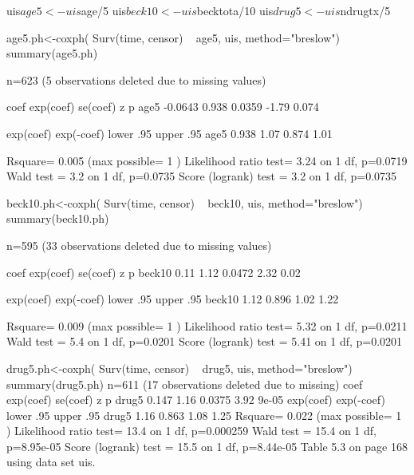 uis$age5 <- uis$age/5
uis$beck10 <- uis$becktota/10
uis$drug5 <- uis$ndrugtx/5

age5.ph<-coxph( Surv(time, censor) ~ age5, uis, method="breslow")
summary(age5.ph)

  n=623 (5 observations deleted due to missing values)

        coef exp(coef) se(coef)     z     p 
age5 -0.0643     0.938   0.0359 -1.79 0.074

     exp(coef) exp(-coef) lower .95 upper .95 
age5     0.938       1.07     0.874      1.01

Rsquare= 0.005   (max possible= 1 )
Likelihood ratio test= 3.24 on 1 df,   p=0.0719
Wald test            = 3.2  on 1 df,   p=0.0735
Score (logrank) test = 3.2  on 1 df,   p=0.0735

beck10.ph<-coxph( Surv(time, censor) ~ beck10, uis, method="breslow")
summary(beck10.ph)

  n=595 (33 observations deleted due to missing values)

       coef exp(coef) se(coef)    z    p 
beck10 0.11      1.12   0.0472 2.32 0.02

       exp(coef) exp(-coef) lower .95 upper .95 
beck10      1.12      0.896      1.02      1.22

Rsquare= 0.009   (max possible= 1 )
Likelihood ratio test= 5.32  on 1 df,   p=0.0211
Wald test            = 5.4   on 1 df,   p=0.0201
Score (logrank) test = 5.41  on 1 df,   p=0.0201

drug5.ph<-coxph( Surv(time, censor) ~ drug5, uis, method="breslow")
summary(drug5.ph)
  n=611 (17 observations deleted due to missing)
       coef exp(coef) se(coef)    z     p
drug5 0.147      1.16   0.0375 3.92 9e-05
      exp(coef) exp(-coef) lower .95 upper .95
drug5      1.16      0.863      1.08      1.25
Rsquare= 0.022   (max possible= 1 )
Likelihood ratio test= 13.4  on 1 df,   p=0.000259
Wald test            = 15.4  on 1 df,   p=8.95e-05
Score (logrank) test = 15.5  on 1 df,   p=8.44e-05
Table 5.3 on page 168 using data set uis. 

